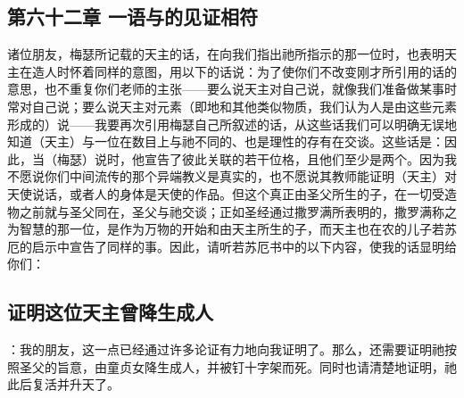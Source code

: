 
\subsection{第六十二章 一语与的见证相符}

诸位朋友，梅瑟所记载的天主的话，在向我们指出祂所指示的那一位时，也表明天主在造人时怀着同样的意图，用以下的话说：为了使你们不改变刚才所引用的话的意思，也不重复你们老师的主张——要么说天主对自己说，就像我们准备做某事时常对自己说；要么说天主对元素（即地和其他类似物质，我们认为人是由这些元素形成的）说——我要再次引用梅瑟自己所叙述的话，从这些话我们可以明确无误地知道（天主）与一位在数目上与祂不同的、也是理性的存有在交谈。这些话是：因此，当（梅瑟）说时，他宣告了彼此关联的若干位格，且他们至少是两个。因为我不愿说你们中间流传的那个异端教义是真实的，也不愿说其教师能证明（天主）对天使说话，或者人的身体是天使的作品。但这个真正由圣父所生的子，在一切受造物之前就与圣父同在，圣父与祂交谈；正如圣经通过撒罗满所表明的，撒罗满称之为智慧的那一位，是作为万物的开始和由天主所生的子，而天主也在农的儿子若苏厄的启示中宣告了同样的事。因此，请听若苏厄书中的以下内容，使我的话显明给你们：\par


\subsection{证明这位天主曾降生成人}

：我的朋友，这一点已经通过许多论证有力地向我证明了。那么，还需要证明祂按照圣父的旨意，由童贞女降生成人，并被钉十字架而死。同时也请清楚地证明，祂此后复活并升天了。\par

